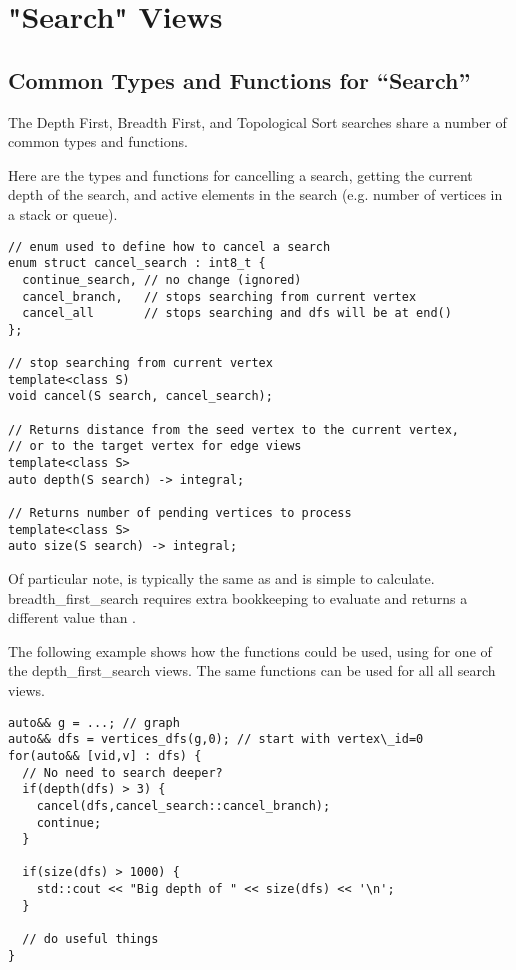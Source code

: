 \section{"Search" Views}

\subsection{Common Types and Functions for ``Search'' }

The Depth First, Breadth First, and Topological Sort searches share a number of common types and functions. 

Here are the types and functions for cancelling a search, getting the current depth of the search, and active elements in the search (e.g. number of vertices in a stack or queue).
\begin{lstlisting}
// enum used to define how to cancel a search
enum struct cancel_search : int8_t { 
  continue_search, // no change (ignored)
  cancel_branch,   // stops searching from current vertex
  cancel_all       // stops searching and dfs will be at end()
};

// stop searching from current vertex
template<class S)
void cancel(S search, cancel_search);

// Returns distance from the seed vertex to the current vertex, 
// or to the target vertex for edge views
template<class S>
auto depth(S search) -> integral;

// Returns number of pending vertices to process
template<class S>
auto size(S search) -> integral; 
\end{lstlisting}

Of particular note,  is typically the same as  and is simple to calculate. breadth\_first\_search requires extra bookkeeping to evaluate  and returns a different value than .

The following example shows how the functions  could be used, using  for one of the depth\_first\_search views. The same functions can be used for all all search views.
\begin{lstlisting}
auto&& g = ...; // graph
auto&& dfs = vertices_dfs(g,0); // start with vertex\_id=0
for(auto&& [vid,v] : dfs) {
  // No need to search deeper?
  if(depth(dfs) > 3) {
    cancel(dfs,cancel_search::cancel_branch);
    continue;
  }
  
  if(size(dfs) > 1000) {
    std::cout << "Big depth of " << size(dfs) << '\n';
  }
  
  // do useful things
}

\end{lstlisting}

